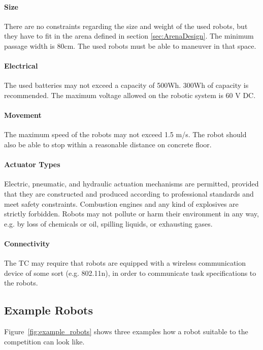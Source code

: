 \paragraph{Size}
There are no constraints regarding the size and weight of the used robots, but they have to fit in the arena defined in section \ref{sec:ArenaDesign}. The minimum passage width is $80\si{\centi\meter}$. The used robots must be able to maneuver in that space.

\paragraph{Electrical}
The used batteries may not exceed a capacity of 500Wh. 300Wh of capacity is recommended. The maximum voltage allowed on the robotic system is 60 V DC.

\paragraph{Movement}
The maximum speed of the robots may not exceed 1.5 m/s. The robot should also be able to stop within a reasonable distance on concrete floor.

\paragraph{Actuator Types}
Electric, pneumatic, and hydraulic actuation mechanisms are permitted, provided that they are constructed and produced according to professional standards and meet safety constraints. Combustion engines and any kind of explosives are strictly forbidden. Robots may not pollute or harm their environment in any way, e.g. by loss of chemicals or oil, spilling liquids, or exhausting gases.

\paragraph{Connectivity} The TC may require that robots are equipped with a wireless communication device of some sort (e.g. 802.11n), in order to communicate task specifications to the robots. 

\subsection{Example Robots}

Figure~\ref{fig:example_robots} shows three examples how a robot suitable to the competition can look like. 

